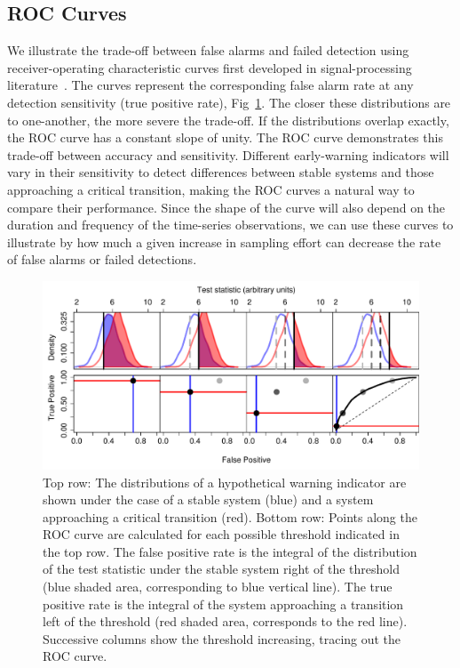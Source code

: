 \documentclass[authoryear,review,11pt]{elsarticle}
\begin{document}
\subsection*{ROC Curves}
We illustrate the trade-off between false alarms and failed detection using
receiver-operating characteristic curves first developed in signal-processing literature~\citep{Green1989, Keller2009}⁠.
The curves represent the corresponding false alarm rate at any detection sensitivity (true positive rate), Fig~\ref{fig:roc_intro}.
The closer these distributions are to one-another, the more severe the trade-off.
If the distributions overlap exactly, the ROC curve has a constant slope of unity.
The ROC curve demonstrates this trade-off between accuracy and sensitivity.
Different early-warning indicators will vary in their sensitivity to detect differences
between stable systems and those approaching a critical transition,
making the ROC curves a natural way to compare their performance.
Since the shape of the curve will also depend on the duration and frequency of the time-series observations,
we can use these curves to illustrate by how much a given increase in sampling effort can decrease the rate of false alarms or failed detections.


\begin{figure}
   \begin{center}
     \includegraphics[width=\linewidth]{figures/Fig1.pdf}
     \caption{Top row: The distributions of a hypothetical warning indicator are shown under the case of a stable system (blue) and a system approaching a critical transition (red).  Bottom row: Points along the ROC curve are calculated for each possible threshold indicated in the top row.  The false positive rate is the integral of the distribution of the test statistic under the stable system right of the threshold (blue shaded area, corresponding to blue vertical line).  The true positive rate is the integral of the system approaching a transition left of the threshold (red shaded area, corresponds to the red line).  Successive columns show the threshold increasing, tracing out the ROC curve.}
     \label{fig:roc_intro}
  \end{center}
 \end{figure}
\end{document}
